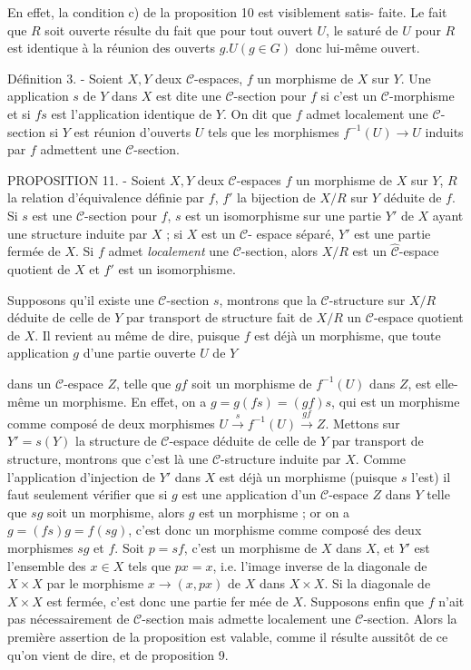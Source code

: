En effet, la condition c) de la proposition 10 est visiblement satis-
faite. Le fait que $R$ soit ouverte résulte du fait que pour tout ouvert
$U$, le saturé de $U$ pour $R$ est identique à la réunion des ouverts $g.U (g \in G)$
donc lui-même ouvert.

Définition 3. - Soient $X,Y$ deux $\mathcal{C}$-espaces, $f$ un morphisme de $X$ sur $Y$.
Une application $s$ de $Y$ dans $X$ est dite une $\mathcal{C}$-section pour $f$ si c'est un
$\mathcal{C}$-morphisme et si $fs$ est l'application identique de $Y$. On dit que $f$
admet localement une $\mathcal{C}$-section si $Y$ est réunion d'ouverts $U$ tels que
les morphismes $f^{-1}(U) \to U$ induits par $f$ admettent une $\mathcal{C}$-section.

PROPOSITION 11. - Soient $X,Y$ deux $\mathcal{C}$-espaces $f$ un morphisme de $X$ sur $Y$,
$R$ la relation d'équivalence définie par $f$, $f'$ la bijection de $X/R$ sur $Y$
déduite de $f$. Si $s$ est une $\mathcal{C}$-section pour $f$, $s$ est un isomorphisme sur
une partie $Y'$ de $X$ ayant une structure induite par $X$ ; si $X$ est un $\mathcal{C}$-
espace séparé, $Y'$ est une partie fermée de $X$. Si $f$ admet \emph{localement} une
$\mathcal{C}$-section, alors $X/R$ est un $\hat{\mathcal{C}}$-espace quotient de $X$ et $f'$ est un
isomorphisme.

Supposons qu'il existe une $\mathcal{C}$-section $s$, montrons que la $\mathcal{C}$-structure
sur $X/R$ déduite de celle de $Y$ par transport de structure fait de $X/R$ un
$\mathcal{C}$-espace quotient de $X$. Il revient au même de dire, puisque $f$ est
déjà un morphisme, que toute application $g$ d'une partie ouverte $U$ de $Y$

\newpage



dans un $\mathcal{C}$-espace $Z$, telle que $gf$ soit un morphisme de $f^{-1}(U)$ dans $Z$,
est elle-même un morphisme. En effet, on a $g = g(fs) = (gf)s$, qui est
un morphisme comme composé de deux morphismes $U \xrightarrow{s} f^{-1}(U) \xrightarrow{gf} Z$. Mettons sur
$Y' = s(Y)$ la structure de $\mathcal{C}$-espace déduite de celle de $Y$ par transport
de structure, montrons que c'est là une $\mathcal{C}$-structure induite par $X$.
Comme l'application d'injection de $Y'$ dans $X$ est déjà un morphisme
(puisque $s$ l'est) il faut seulement vérifier que si $g$ est une application
d'un $\mathcal{C}$-espace $Z$ dans $Y$ telle que $sg$ soit un morphisme, alors $g$ est
un morphisme ; or on a $g = (fs)g=f(sg)$, c'est donc un morphisme comme
composé des deux morphismes $sg$ et $f$. Soit $p = sf$, c'est un morphisme de
$X$ dans $X$, et $Y'$ est l'ensemble des $x \in X$ tels que $px = x$, i.e. l'image
inverse de la diagonale de $X \times X$ par le morphisme $x \to (x,px)$ de $X$
dans $X \times X$. Si la diagonale de $X \times X$ est fermée, c'est donc une partie fer
mée de $X$. Supposons enfin que $f$ n'ait pas nécessairement de $\mathcal{C}$-section
mais admette localement une $\mathcal{C}$-section. Alors la première assertion de
la proposition est valable, comme il résulte aussitôt de ce qu'on vient
de dire, et de proposition 9.

